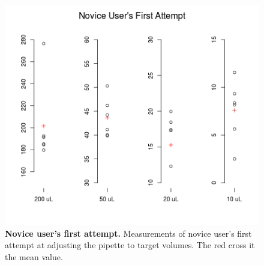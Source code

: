 \documentclass[]{article}
\begin{document}
\begin{figure}
\includegraphics[scale=0.7]{fig3.png}
\caption{
{\bf Novice user's first attempt.} Measurements of novice user's first attempt at adjusting the pipette to target volumes. The red cross it the mean value.
}
\label{figure3}
\end{figure}




\end{document}
